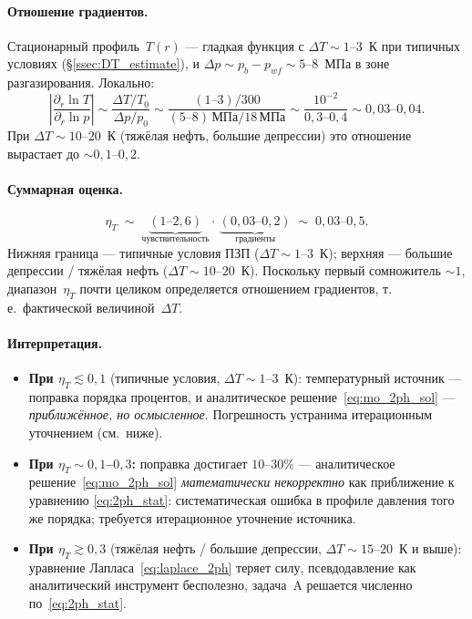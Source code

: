 ﻿\documentclass[12pt,a4paper]{article}
\begin{document}
\paragraph{Отношение градиентов.}
Стационарный профиль~$T(r)$ --- гладкая функция с
$\Delta T \sim 1$--$3$~К при типичных условиях
(\S\ref{ssec:DT_estimate}), и $\Delta p \sim p_b - p_{wf}
\sim 5$--$8$~МПа в зоне разгазирования. Локально:
\begin{equation}\label{eq:eta_num2}
  \left|\frac{\partial_r \ln T}{\partial_r \ln p}\right|
  \sim \frac{\Delta T / T_0}{\Delta p / p_0}
  \sim \frac{(1\text{--}3)/300}{(5\text{--}8)\,\text{МПа}/18\,\text{МПа}}
  \sim \frac{10^{-2}}{0{,}3\text{--}0{,}4}
  \sim 0{,}03\text{--}0{,}04.
\end{equation}
При $\Delta T \sim 10$--$20$~К (тяжёлая нефть, большие
депрессии) это отношение вырастает до $\sim 0{,}1$--$0{,}2$.

\paragraph{Суммарная оценка.}
\begin{equation}\label{eq:eta_total}
  \boxed{\;
  \eta_T \;\sim\;
  \underbrace{(1\text{--}2{,}6)}_{\text{чувствительность}}
  \cdot\,
  \underbrace{(0{,}03\text{--}0{,}2)}_{\text{градиенты}}
  \;\sim\; 0{,}03\text{--}0{,}5.\;}
\end{equation}
Нижняя граница --- типичные условия ПЗП ($\Delta T \sim 1$--$3$~К);
верхняя --- большие депрессии / тяжёлая нефть
($\Delta T \sim 10$--$20$~К). Поскольку первый
сомножитель $\sim 1$, диапазон~$\eta_T$ почти
целиком определяется отношением градиентов,
т.\,е.\ фактической величиной~$\Delta T$.

\paragraph{Интерпретация.}
\begin{itemize}[nosep]
  \item \textbf{При $\eta_T \lesssim 0{,}1$}
        (типичные условия, $\Delta T \sim 1$--$3$~К):
        температурный источник --- поправка порядка
        процентов, и аналитическое решение~\eqref{eq:mo_2ph_sol}
        --- \emph{приближённое, но осмысленное}.
        Погрешность устранима итерационным уточнением
        (см.~ниже).
  \item \textbf{При $\eta_T \sim 0{,}1$--$0{,}3$:}
        поправка достигает $10$--$30\%$ --- аналитическое
        решение~\eqref{eq:mo_2ph_sol} \emph{математически
        некорректно} как приближение к уравнению
        \eqref{eq:2ph_stat}: систематическая ошибка
        в профиле давления того же порядка; требуется
        итерационное уточнение источника.
  \item \textbf{При $\eta_T \gtrsim 0{,}3$}
        (тяжёлая нефть / большие депрессии,
        $\Delta T \sim 15$--$20$~К и выше):
        уравнение Лапласа~\eqref{eq:laplace_2ph}
        теряет силу, псевдодавление как
        аналитический инструмент бесполезно,
        задача~A решается численно по~\eqref{eq:2ph_stat}.
\end{itemize}
\end{document}
